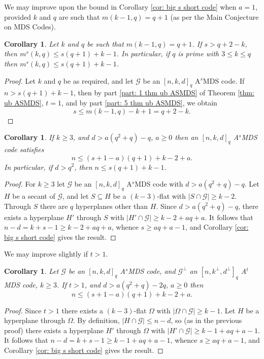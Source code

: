 \documentclass[11pt,a4paper]{amsart}
\newcommand{\AS}{ A$^s$MDS }
\newcommand{\G}{\mathcal{G}}
\theoremstyle{plain}
\newtheorem{corollary}[theorem]{Corollary}
\theoremstyle{definition}
\theoremstyle{remark}
\begin{document}
	We may improve upon the bound in Corollary \ref{cor: big s short code} when $a=1$, provided $k$ and $q$ are such that $m(k-1,q)=q+1$ (as per the Main Conjecture on MDS Codes).
	\begin{corollary}\label{cor: MC big s short code}
		Let $k$ and $q$ be such that $m(k-1,q)=q+1$. If $s>q+2-k$, then $m^s(k,q)\le s(q+1)+k-1$.
		In particular, if $q$ is prime with $3\le k \le q$ then $m^s(k,q)\le s(q+1)+k-1$.
	\end{corollary}
	\begin{proof}
		Let $k$ and $q$ be as required, and let $\G$ be an $[n,k,d]_q$ \AS code. If $n>s(q+1)+k-1 $, then by part \ref{part: 1 thm ub ASMDS} of Theorem \ref{thm: ub ASMDS}, $t=1$, and by part \ref{part: 5 thm ub ASMDS}, we obtain
		\[
		s\le m(k-1,q)-k+1=q+2-k.
		\]
	\end{proof}

	\begin{corollary}\label{cor: big d means short}
		If $k\ge 3$, and $d>a (q^2+q)-q$, $a\ge 0$ then an $[n,k,d]_q$ \AS code satisfies
		\[n\le (s+1-a)(q+1)+k-2+a.\]
		In particular, if $d>q^2$, then $n\le s(q+1)+k-1$.
	\end{corollary}
	\begin{proof}
		For $k\ge 3$ let $\G$ be an $[n,k,d]_q$ \AS code with $d>a (q^2+q)-q$.  Let $H$ be a secant of $\G$, and let $S\subseteq H $ be a $(k-3)$-flat with $|S\cap \G|\ge k-2$.  Through $S$ there are $q$ hyperplanes other than $H$. Since $d>a (q^2+q)-q$, there exists a hyperplane $H'$ through $S$ with $|H'\cap \G|\ge k-2 + a q +a $. It follows that
		$n-d=k+s-1\ge k-2 +a q+a $, whence $s\ge a q+a-1 $, and Corollary \ref{cor: big s short code} gives the result.
	\end{proof}

	We may improve slightly if $t>1$.

	\begin{corollary}\label{cor: big d means short t>1}
		Let $\G$ be an $[n,k,d]_q$ \AS code, and $\G^\perp$ an $[n,k^\perp,d^\perp]_q$ A$^t$MDS code, $k\ge 3$. If $t>1$, and $d>a (q^2+q)-2q$, $a\ge 0$ then
		\[n\le (s+1-a)(q+1)+k-2+a.\]
	\end{corollary}
	\begin{proof}
		Since $t>1$ there exists a $(k-3)$-flat $\Omega$ with $|\Omega\cap \G|\ge k-1$. Let $H$ be a hyperplane through $\Omega$. By definition, $|H\cap \G|\le n-d$,  so (as in the previous proof) there exists a hyperplane $H'$ through $\Omega$ with $|H'\cap \G|\ge k-1 + a q +a -1$. It follows that
		$n-d=k+s-1\ge k-1+a q+a -1$, whence $s\ge a q+a-1$, and  Corollary \ref{cor: big s short code} gives the result.
	\end{proof}
\end{document}
